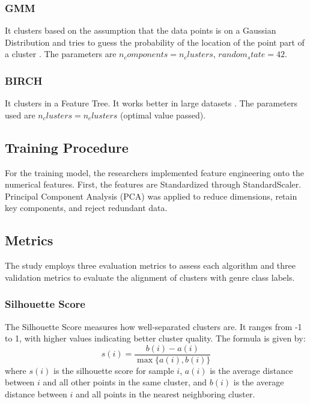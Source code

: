 \documentclass[conference]{IEEEtran}
\begin{document}
\subsubsection{GMM}
It clusters based on the assumption that the data points is on a Gaussian Distribution and tries to guess the probability of the location of the point part of a cluster \cite{b7}. The parameters are $n_components=n_clusters$, $random_state=42$.

\subsubsection{BIRCH}
It clusters in a Feature Tree. It works better in large datasets \cite{b7}. The parameters used are $n_clusters=n_clusters$ (optimal value passed).


\subsection{Training Procedure}\label{SCM}

For the training model, the researchers implemented feature engineering onto the numerical features. First, the features are Standardized through StandardScaler. Principal Component Analysis (PCA) was applied to reduce dimensions, retain key components, and reject redundant data.

\subsection{Metrics}
The study employs three evaluation metrics to assess each algorithm and three validation metrics to evaluate the alignment of clusters with genre class labels.

\subsubsection{Silhouette Score}
The Silhouette Score measures how well-separated clusters are. It ranges from -1 to 1, with higher values indicating better cluster quality. The formula is given by:
\begin{equation}
    s(i) = \frac{b(i) - a(i)}{\max\{a(i), b(i)\}}
    \label{eq:silhouette_score}
\end{equation}
where \( s(i) \) is the silhouette score for sample \( i \), \( a(i) \) is the average distance between \( i \) and all other points in the same cluster, and \( b(i) \) is the average distance between \( i \) and all points in the nearest neighboring cluster.
\end{document}

